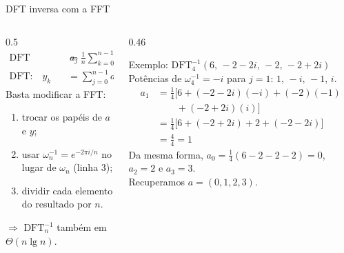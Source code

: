 \documentclass[aspectratio=169,10pt]{beamer}
\newcommand{\proc}[1]{\textnormal{\rmfamily\textsc{#1}}}
\newcommand{\w}[2][n]{\omega_{#1}^{#2}}       %
\newcommand{\DFT}{\mathrm{DFT}}
\begin{document}
\begin{frame}{DFT inversa com a FFT}
  \begin{columns}[T]
    \begin{column}{0.5\textwidth}
      \vspace{-6pt}
      \begin{align*}
        \text{DFT inversa:}\quad a_j &= \frac{1}{n}\sum_{k=0}^{n-1} y_k\, \w{-kj}\\
        \text{DFT:}\quad y_k &= \sum_{j=0}^{n-1} a_j\,\w{kj}
      \end{align*}
      Basta modificar a \proc{FFT}:
      \begin{enumerate}
        \item trocar os papéis de $a$ e $y$;
        \item usar $\omega_n^{-1} = e^{-2\pi i/n}$ no lugar de $\omega_n$ (linha 3);
        \item dividir cada elemento do resultado por $n$.
      \end{enumerate}
      $\Rightarrow$ $\DFT_n^{-1}$ também em \textbf{$\Theta(n\lg n)$}.
    \end{column}
    \begin{column}{0.46\textwidth}
      \begin{exampleblock}{Exemplo: $\DFT_4^{-1}(6,\,-2{-}2i,\,-2,\,-2{+}2i)$}
        Potências de $\w[4]{-1} = -i$ para $j=1$: $1,\,-i,\,-1,\,i$.
        \begin{align*}
          a_1 &= \tfrac14\big[6 + (-2{-}2i)(-i) + (-2)(-1)\\
              &\qquad + (-2{+}2i)(i)\big]\\
              &= \tfrac14\big[6 + (-2{+}2i) + 2 + (-2{-}2i)\big]\\
              &= \tfrac44 = 1
        \end{align*}
        Da mesma forma, $a_0 = \tfrac14(6 - 2 - 2 - 2) = 0$, $a_2 = 2$ e $a_3 = 3$.\\
        Recuperamos $a = (0,1,2,3)$.
      \end{exampleblock}
    \end{column}
  \end{columns}
\end{frame}
\end{document}
